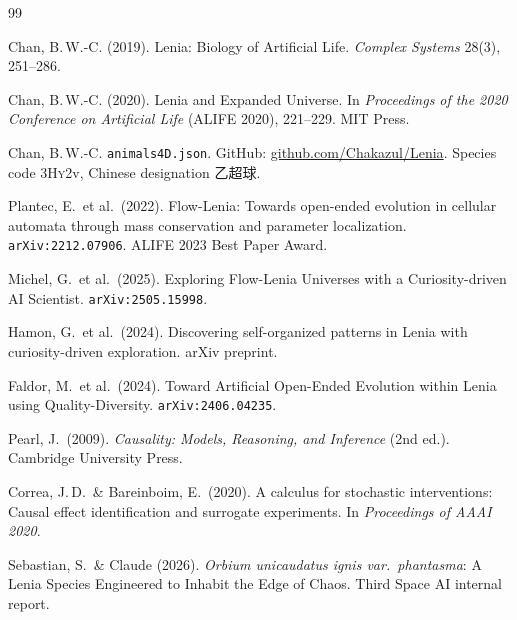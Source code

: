 \documentclass[11pt,a4paper]{article}
\begin{document}
\begin{thebibliography}{99}
\small

Chan, B.\,W.-C. (2019).
\newblock Lenia: Biology of Artificial Life.
\newblock \textit{Complex Systems} 28(3), 251--286.

Chan, B.\,W.-C. (2020).
\newblock Lenia and Expanded Universe.
\newblock In \textit{Proceedings of the 2020 Conference on Artificial Life}
  (ALIFE 2020), 221--229. MIT Press.

Chan, B.\,W.-C.
\newblock \texttt{animals4D.json}. GitHub: \url{github.com/Chakazul/Lenia}.
\newblock Species code 3\textsc{Hy}2v, Chinese designation 乙超球.

Plantec, E.\ et al.\ (2022).
\newblock Flow-Lenia: Towards open-ended evolution in cellular automata
  through mass conservation and parameter localization.
\newblock \texttt{arXiv:2212.07906}. ALIFE 2023 Best Paper Award.

Michel, G.\ et al.\ (2025).
\newblock Exploring Flow-Lenia Universes with a Curiosity-driven AI Scientist.
\newblock \texttt{arXiv:2505.15998}.

Hamon, G.\ et al.\ (2024).
\newblock Discovering self-organized patterns in Lenia with
  curiosity-driven exploration. arXiv preprint.

Faldor, M.\ et al.\ (2024).
\newblock Toward Artificial Open-Ended Evolution within Lenia using
  Quality-Diversity. \texttt{arXiv:2406.04235}.

Pearl, J.\ (2009).
\newblock \textit{Causality: Models, Reasoning, and Inference}
  (2nd ed.). Cambridge University Press.

Correa, J.\,D.\ \& Bareinboim, E.\ (2020).
\newblock A calculus for stochastic interventions: Causal effect
  identification and surrogate experiments.
\newblock In \textit{Proceedings of AAAI 2020}.

Sebastian, S.\ \& Claude (2026).
\newblock \textit{Orbium unicaudatus ignis var.\ phantasma}: A Lenia
  Species Engineered to Inhabit the Edge of Chaos. Third Space AI internal
  report.


\end{thebibliography}
\end{document}
